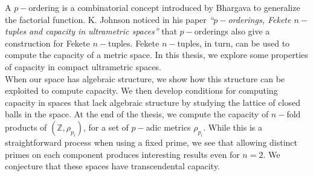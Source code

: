 

%
A $p-$ordering is a combinatorial concept introduced by Bhargava to generalize the factorial function. K. Johnson noticed in his paper \textit{``$p-$orderings, Fekete $n-$tuples and capacity in ultrametric spaces''} that $p-$orderings also give a construction for Fekete $n-$tuples. Fekete $n-$tuples, in turn, can be used to compute the capacity of a metric space. In this thesis, we explore some properties of capacity in compact ultrametric spaces. \\

When our space has algebraic structure, we show how this structure can be exploited to compute capacity. We then develop conditions for computing capacity in spaces that lack algebraic structure by studying the lattice of closed balls in the space. At the end of the thesis, we compute the capacity of $n-$fold products of $(\mathbb{Z}, \rho_{p_i})$, for a set of $p-$adic metrics $\rho_{p_i}$. While this is a  straightforward process when using a fixed prime, we see that allowing distinct primes on each component produces interesting results even for $n=2$. We conjecture that these spaces have transcendental capacity.
%